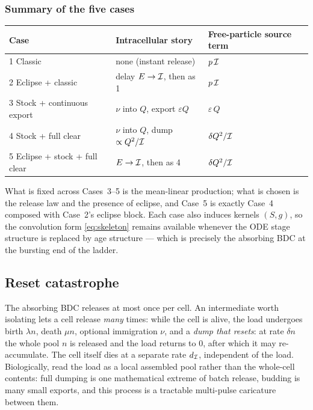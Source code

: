 \subsubsection{Summary of the five cases}

\begin{center}
\renewcommand{\arraystretch}{1.25}
\small
\begin{tabular}{@{}p{}p{}p{}@{}}
\toprule
Case & Intracellular story & Free-particle source term \\
\midrule
1 Classic & none (instant release) & $p\,\mathcal{I}$ \\
2 Eclipse + classic & delay $E\to\mathcal{I}$, then as 1 & $p\,\mathcal{I}$ \\
3 Stock + continuous export & $\nu$ into $Q$, export $\varepsilon Q$ & $\varepsilon\,Q$ \\
4 Stock + full clear & $\nu$ into $Q$, dump $\propto Q^2/\mathcal{I}$ & $\delta Q^2/\mathcal{I}$ \\
5 Eclipse + stock + full clear & $E\to\mathcal{I}$, then as 4 & $\delta Q^2/\mathcal{I}$ \\
\bottomrule
\end{tabular}
\end{center}
What is fixed across Cases~3--5 is the mean-linear production; what is
chosen is the release law and the presence of eclipse, and Case~5 is
exactly Case~4 composed with Case~2's eclipse block. Each case also induces
kernels $(S,g)$, so the convolution form \eqref{eq:skeleton} remains
available whenever the ODE stage structure is replaced by age structure ---
which is precisely the absorbing BDC at the bursting end of the ladder.

\subsection{Reset catastrophe}
\label{sec:reset}

The absorbing BDC releases at most once per cell. An intermediate worth
isolating lets a cell release \emph{many} times: while the cell is alive,
the load undergoes birth $\lambda n$, death $\mu n$, optional immigration
$\nu$, and a \emph{dump that resets}: at rate $\delta n$ the whole pool $n$
is released and the load returns to $0$, after which it may re-accumulate.
The cell itself dies at a separate rate $d_{\mathcal{I}}$, independent of the
load. Biologically, read the load as a local assembled pool rather than the
whole-cell contents: full dumping is one mathematical extreme of batch
release, budding is many small exports, and this process is a tractable
multi-pulse caricature between them.

